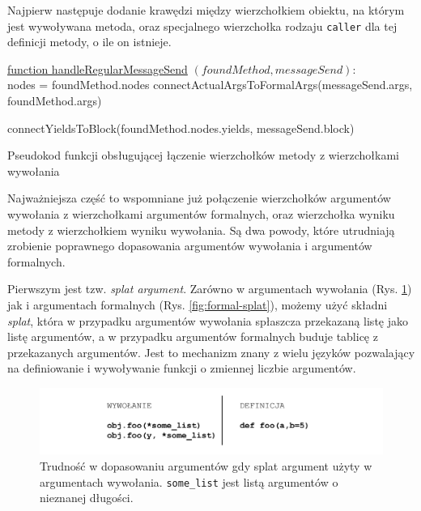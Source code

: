 \documentclass[shortabstract,mgr]{iithesis}
\newcommand{\algsize}{\small}
\begin{document}
Najpierw następuje dodanie krawędzi między wierzchołkiem obiektu, na którym jest wywoływana metoda, oraz specjalnego wierzchołka rodzaju \texttt{caller} dla tej definicji metody, o ile on istnieje.

\begin{algorithm}
    \algsize
    \underline{function handleRegularMessageSend} $(\mathit{foundMethod}, \mathit{messageSend})$:\\
    nodes = foundMethod.nodes\;
    connectActualArgsToFormalArgs(messageSend.args, foundMethod.args)\;

    connectYieldsToBlock(foundMethod.nodes.yields, messageSend.block)\;
    \caption{Pseudokod funkcji obsługującej łączenie wierzchołków metody z wierzchołkami wywołania}
    \label{alg:handleRegularMessageSend}
\end{algorithm}

Najważniejsza część to wspomniane już połączenie wierzchołków argumentów wywołania z wierzchołkami argumentów formalnych, oraz wierzchołka wyniku metody z wierzchołkiem wyniku wywołania. Są dwa powody, które utrudniają zrobienie poprawnego dopasowania argumentów wywołania i argumentów formalnych.

Pierwszym jest tzw. \textit{splat argument}. Zarówno w argumentach wywołania (Rys. \ref{fig:actual-splat}) jak i argumentach formalnych (Rys. \ref{fig:formal-splat}), możemy użyć składni \emph{splat}, która w przypadku argumentów wywołania spłaszcza przekazaną listę jako listę argumentów, a w przypadku argumentów formalnych buduje tablicę z przekazanych argumentów. Jest to mechanizm znany z wielu języków pozwalający na definiowanie i wywoływanie funkcji o zmiennej liczbie argumentów.

\begin{figure}[htb]
	\centering
	\includegraphics[scale=0.6]{imgs/splat.png}
	\caption{Trudność w dopasowaniu argumentów gdy splat argument użyty w argumentach wywołania. 	\texttt{some\_list} jest listą argumentów o nieznanej długości.}
	\label{fig:actual-splat}
\end{figure}
\end{document}
